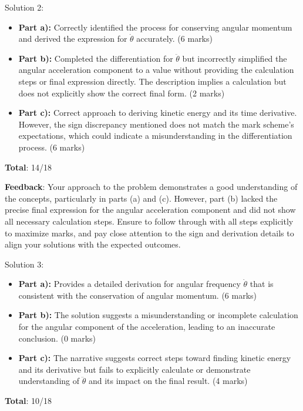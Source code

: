 \documentclass[a4paper,11pt]{article}
\begin{document}
Solution 2:

\begin{itemize}
    \item \textbf{Part a):} Correctly identified the process for conserving angular momentum and derived the expression for $\dot{\theta}$ accurately. (6 marks)
    \item \textbf{Part b):} Completed the differentiation for $\ddot{\theta}$ but incorrectly simplified the angular acceleration component to a value without providing the calculation steps or final expression directly. The description implies a calculation but does not explicitly show the correct final form. (2 marks)
    \item \textbf{Part c):} Correct approach to deriving kinetic energy and its time derivative. However, the sign discrepancy mentioned does not match the mark scheme's expectations, which could indicate a misunderstanding in the differentiation process. (6 marks)
\end{itemize}

\textbf{Total}: 14/18

\textbf{Feedback}: Your approach to the problem demonstrates a good understanding of the concepts, particularly in parts (a) and (c). However, part (b) lacked the precise final expression for the angular acceleration component and did not show all necessary calculation steps. Ensure to follow through with all steps explicitly to maximize marks, and pay close attention to the sign and derivation details to align your solutions with the expected outcomes.

Solution 3:

\begin{itemize}
    \item \textbf{Part a):} Provides a detailed derivation for angular frequency $\dot{\theta}$ that is consistent with the conservation of angular momentum. (6 marks)
    \item \textbf{Part b):} The solution suggests a misunderstanding or incomplete calculation for the angular component of the acceleration, leading to an inaccurate conclusion. (0 marks)
    \item \textbf{Part c):} The narrative suggests correct steps toward finding kinetic energy and its derivative but fails to explicitly calculate or demonstrate understanding of $\ddot{\theta}$ and its impact on the final result. (4 marks)
\end{itemize}

\textbf{Total}: 10/18
\end{document}

